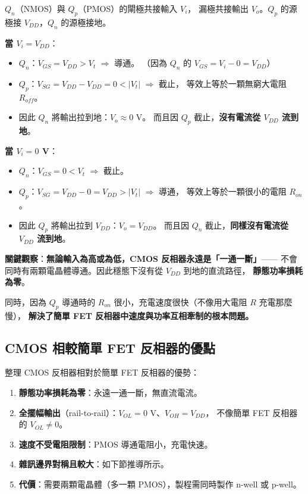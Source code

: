 \documentclass[12pt]{article}
\begin{document}
\begin{keybox}
$Q_n$（NMOS）與 $Q_p$（PMOS）的閘極共接輸入 $V_i$，
漏極共接輸出 $V_o$。$Q_p$ 的源極接 $V_{DD}$，$Q_n$ 的源極接地。

\medskip
\textbf{當 $V_i = V_{DD}$}：
\begin{itemize}[leftmargin=2.2em,itemsep=1pt]
  \item $Q_n$：$V_{GS} = V_{DD} > V_t$ $\Rightarrow$ 導通。
    （因為 $Q_n$ 的 $V_{GS} = V_i - 0 = V_{DD}$）
  \item $Q_p$：$V_{SG} = V_{DD} - V_{DD} = 0 < |V_t|$ $\Rightarrow$ 截止，
    等效上等於一顆無窮大電阻 $R_{off}$。
  \item 因此 $Q_n$ 將輸出拉到地：$V_o \approx 0$ V。
    而且因 $Q_p$ 截止，\textbf{沒有電流從 $V_{DD}$ 流到地}。
\end{itemize}

\medskip
\textbf{當 $V_i = 0$ V}：
\begin{itemize}[leftmargin=2.2em,itemsep=1pt]
  \item $Q_n$：$V_{GS} = 0 < V_t$ $\Rightarrow$ 截止。
  \item $Q_p$：$V_{SG} = V_{DD} - 0 = V_{DD} > |V_t|$ $\Rightarrow$ 導通，
    等效上等於一顆很小的電阻 $R_{on}$。
  \item 因此 $Q_p$ 將輸出拉到 $V_{DD}$：$V_o = V_{DD}$。
    而且因 $Q_n$ 截止，\textbf{同樣沒有電流從 $V_{DD}$ 流到地}。
\end{itemize}

\medskip
\textbf{關鍵觀察}：\textbf{無論輸入為高或為低，CMOS 反相器永遠是「一通一斷」}——
不會同時有兩顆電晶體導通。因此穩態下沒有從 $V_{DD}$ 到地的直流路徑，
\textbf{靜態功率損耗為零}。

同時，因為 $Q_p$ 導通時的 $R_{on}$ 很小，充電速度很快（不像用大電阻 $R$ 充電那麼慢），
\textbf{解決了簡單 FET 反相器中速度與功率互相牽制的根本問題。}
\end{keybox}

\subsection*{CMOS 相較簡單 FET 反相器的優點}

整理 CMOS 反相器相對於簡單 FET 反相器的優勢：

\begin{enumerate}[leftmargin=2.2em,itemsep=2pt]
  \item \textbf{靜態功率損耗為零}：永遠一通一斷，無直流電流。
  \item \textbf{全擺幅輸出}（rail-to-rail）：$V_{OL} = 0$ V、$V_{OH} = V_{DD}$，
    不像簡單 FET 反相器的 $V_{OL} \neq 0$。
  \item \textbf{速度不受電阻限制}：PMOS 導通電阻小，充電快速。
  \item \textbf{雜訊邊界對稱且較大}：如下節推導所示。
  \item \textbf{代價}：需要兩顆電晶體（多一顆 PMOS），製程需同時製作 n-well 或 p-well。
\end{enumerate}
\end{document}
